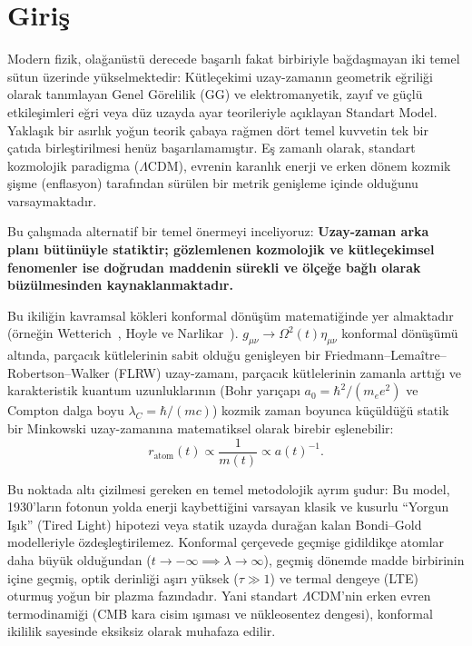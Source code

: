 \section{Giriş}
\label{sec:giris}

Modern fizik, olağanüstü derecede başarılı fakat birbiriyle bağdaşmayan iki temel sütun üzerinde yükselmektedir: Kütleçekimi uzay-zamanın geometrik eğriliği olarak tanımlayan Genel Görelilik (GG) ve elektromanyetik, zayıf ve güçlü etkileşimleri eğri veya düz uzayda ayar teorileriyle açıklayan Standart Model. Yaklaşık bir asırlık yoğun teorik çabaya rağmen dört temel kuvvetin tek bir çatıda birleştirilmesi henüz başarılamamıştır. Eş zamanlı olarak, standart kozmolojik paradigma ($\Lambda$CDM), evrenin karanlık enerji ve erken dönem kozmik şişme (enflasyon) tarafından sürülen bir metrik genişleme içinde olduğunu varsaymaktadır.

Bu çalışmada alternatif bir temel önermeyi inceliyoruz: \textbf{Uzay-zaman arka planı bütünüyle statiktir; gözlemlenen kozmolojik ve kütleçekimsel fenomenler ise doğrudan maddenin sürekli ve ölçeğe bağlı olarak büzülmesinden kaynaklanmaktadır.}

Bu ikiliğin kavramsal kökleri konformal dönüşüm matematiğinde yer almaktadır (örneğin Wetterich~\cite{wetterich2013}, Hoyle ve Narlikar~\cite{hoyle1964}). $g_{\mu\nu} \to \Omega^2(t) \eta_{\mu\nu}$ konformal dönüşümü altında, parçacık kütlelerinin sabit olduğu genişleyen bir Friedmann--Lema\^itre--Robertson--Walker (FLRW) uzay-zamanı, parçacık kütlelerinin zamanla arttığı ve karakteristik kuantum uzunluklarının (Bohr yarıçapı $a_0 = \hbar^2/(m_e e^2)$ ve Compton dalga boyu $\lambda_C = \hbar/(mc)$) kozmik zaman boyunca küçüldüğü statik bir Minkowski uzay-zamanına matematiksel olarak birebir eşlenebilir:
\begin{equation}
      r_{\mathrm{atom}}(t) \propto \frac{1}{m(t)} \propto a(t)^{-1}.
      \label{eq:konformal_olcekleme}
\end{equation}

Bu noktada altı çizilmesi gereken en temel metodolojik ayrım şudur: Bu model, 1930'ların fotonun yolda enerji kaybettiğini varsayan klasik ve kusurlu ``Yorgun Işık'' (Tired Light) hipotezi veya statik uzayda durağan kalan Bondi--Gold modelleriyle özdeşleştirilemez. Konformal çerçevede geçmişe gidildikçe atomlar daha büyük olduğundan ($t \to -\infty \implies \lambda \to \infty$), geçmiş dönemde madde birbirinin içine geçmiş, optik derinliği aşırı yüksek ($\tau \gg 1$) ve termal dengeye (LTE) oturmuş yoğun bir plazma fazındadır. Yani standart $\Lambda$CDM'nin erken evren termodinamiği (CMB kara cisim ışıması ve nükleosentez dengesi), konformal ikililik sayesinde eksiksiz olarak muhafaza edilir.


